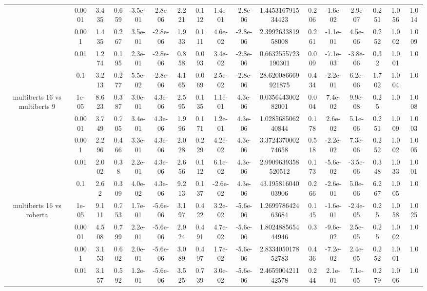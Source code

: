 \begin{tabular}{|c|c|c|c|c|c|c|c|c|c|c|c|c|c|c|c|c|}
 & 0.0001 & 3.435 & 0.659 & 3.5e-01 & -2.8e-06 & 2.221 & 0.112 & 1.4e-01 & -2.8e-06 & 1.445316791534423 & 0.206 & -1.6e-02 & -2.9e-07 & 0.251 & 1.056 & 1.014 \\
 & 0.001 & 1.435 & 0.267 & 3.5e-01 & -2.8e-06 & 1.933 & 0.111 & 4.6e-02 & -2.8e-06 & 2.399263381958008 & 0.261 & -1.1e-01 & 4.5e-06 & 0.252 & 1.002 & 1.009 \\
 & 0.01 & 1.274 & 0.195 & 2.3e-01 & -2.8e-06 & 0.858 & 0.093 & 3.4e-02 & -2.8e-06 & 0.6632555723190301 & 0.009 & -7.1e-03 & -3.8e-06 & 0.32 & 1.001 & 1.0 \\
 & 0.1 & 3.213 & 0.277 & 5.5e-02 & -2.8e-06 & 4.165 & 0.069 & 2.5e-02 & -2.8e-06 & 28.620086669921875 & 0.434 & -2.2e-01 & 6.2e-06 & 1.702 & 1.004 & 1.0 \\
\hline
\multirow{5}{*}{multiberts 16 vs multiberts 9} & 1e-05 & 8.623 & 0.387 & 3.0e-01 & 4.3e-06 & 2.595 & 0.135 & 1.1e-01 & 4.3e-06 & 0.035644300282001 & 0.004 & 7.4e-02 & 9.9e-08 & 0.25 & 1.0 & 1.008 \\
 & 0.0001 & 3.749 & 0.705 & 3.4e-01 & 4.3e-06 & 1.996 & 0.171 & 1.2e-01 & 4.3e-06 & 1.028568506240844 & 0.178 & 2.6e-02 & 5.1e-06 & 0.251 & 1.009 & 1.003 \\
 & 0.001 & 2.296 & 0.466 & 3.3e-01 & 4.3e-06 & 2.028 & 0.229 & 4.2e-02 & 4.3e-06 & 3.372437000274658 & 0.518 & -2.2e-02 & 7.3e-06 & 0.252 & 1.002 & 1.005 \\
 & 0.01 & 2.002 & 0.38 & 2.2e-01 & 4.3e-06 & 2.656 & 0.112 & 6.1e-02 & 4.3e-06 & 2.9909639358520512 & 0.173 & -5.6e-02 & -3.5e-06 & 0.348 & 1.033 & 1.001 \\
 & 0.1 & 2.62 & 0.309 & 4.0e-02 & 4.3e-06 & 9.213 & 0.137 & -2.6e-02 & 4.3e-06 & 43.19581604003906 & 0.266 & -2.6e-01 & 5.0e-06 & 6.267 & 1.005 & 1.0 \\
\hline
\multirow{5}{*}{multiberts 16 vs roberta } & 1e-05 & 9.111 & 0.753 & 1.7e-01 & -5.6e-06 & 3.197 & 0.422 & 3.2e-02 & -5.6e-06 & 1.269978642463684 & 0.145 & -1.6e-01 & -2.4e-05 & 0.25 & 1.058 & 1.025 \\
 & 0.0001 & 4.508 & 0.799 & 2.2e-01 & -5.6e-06 & 2.924 & 0.491 & 4.7e-02 & -5.6e-06 & 1.802488565444946 & 0.3 & -9.6e-02 & 2.5e-05 & 0.25 & 1.002 & 1.0 \\
 & 0.001 & 3.153 & 0.602 & 2.0e-01 & -5.6e-06 & 3.089 & 0.497 & 1.7e-02 & -5.6e-06 & 2.833405017852783 & 0.436 & -7.2e-02 & 2.4e-05 & 0.252 & 1.001 & 1.0 \\
 & 0.01 & 3.157 & 0.592 & 1.2e-01 & -5.6e-06 & 3.525 & 0.739 & 3.0e-02 & -5.6e-06 & 2.465900421142578 & 0.244 & 2.1e-01 & 7.1e-05 & 0.279 & 1.006 & 1.0 \\

\end{tabular}
